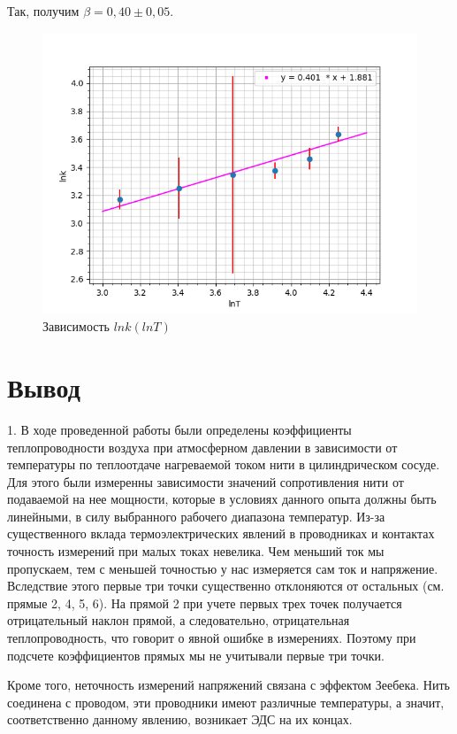 \documentclass[12pt,a4paper]{article}
\begin{document}
\begin{enumerate}
Так, получим $\beta=0,40\pm0,05$.
\begin{figure}[h!]
    \centering
    \includegraphics[scale=0.72]{lnk(lnT).png}
    \caption{Зависимость $lnk(lnT)$}
\end{figure}


\end{enumerate}
\newpage

\section{Вывод}

1. В ходе проведенной работы были определены коэффициенты теплопроводности воздуха при атмосферном давлении в зависимости от температуры по теплоотдаче нагреваемой током нити в цилиндрическом сосуде. Для этого были измеренны зависимости значений сопротивления нити от подаваемой на нее мощности, которые в условиях данного опыта должны быть линейными, в силу выбранного рабочего диапазона температур. Из-за
существенного вклада термоэлектрических явлений в проводниках и контактах точность измерений при малых токах невелика. Чем меньший ток мы пропускаем, тем с меньшей точностью у нас измеряется сам ток и напряжение. Вследствие этого первые три точки существенно отклоняются от остальных (см. прямые 2, 4, 5, 6). На прямой 2 при учете первых трех точек получается отрицательный наклон прямой, а следовательно, отрицательная теплопроводность, что говорит о явной ошибке в измерениях. Поэтому при подсчете коэффициентов прямых мы не учитывали первые три точки. 

Кроме того, неточность измерений напряжений связана с эффектом Зеебека. Нить соединена с проводом, эти проводники имеют различные температуры, а значит, соответственно данному явлению, возникает ЭДС на их концах.
\end{document}
